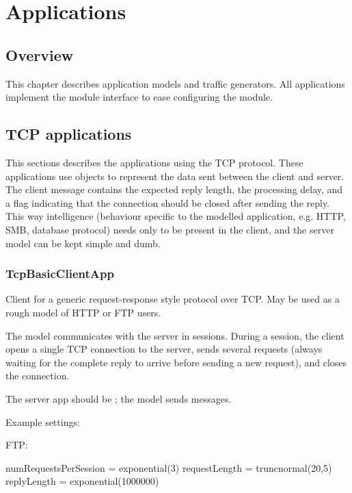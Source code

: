 \chapter{Applications}
\label{cha:apps}


\section{Overview}

This chapter describes application models and traffic generators.
All applications implement the  module interface
to ease configuring the  module.

\section{TCP applications}

This sections describes the applications using the TCP protocol.
These applications use  objects to represent the data
sent between the client and server. The client message contains the expected
reply length, the processing delay, and a flag indicating that the connection
should be closed after sending the reply. This way intelligence (behaviour
specific to the modelled application, e.g. HTTP, SMB, database protocol) needs
only to be present in the client, and the server model can be kept simple and
dumb.


\subsection{TcpBasicClientApp}

Client for a generic request-response style protocol over TCP.
May be used as a rough model of HTTP or FTP users.

The model communicates with the server in sessions. During a session,
the client opens a single TCP connection to the server, sends several
requests (always waiting for the complete reply to arrive before
sending a new request), and closes the connection.

The server app should be ; the model sends
 messages.

Example settings:

FTP:

\begin{inifile}
numRequestsPerSession = exponential(3)
requestLength = truncnormal(20,5)
replyLength = exponential(1000000)
\end{inifile}

